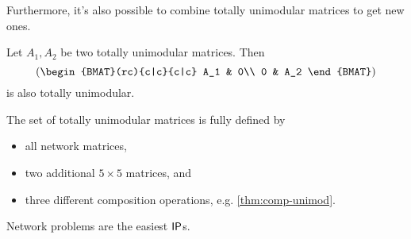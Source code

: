 Furthermore, it's also possible to combine totally unimodular matrices to get new ones.
\begin{theorem}
    Let $A_1,A_2$ be two totally unimodular matrices. Then
    \[
        \left(
        \begin{BMAT}(rc){c|c}{c|c}
                A_1 & 0\\
                0 & A_2
            \end{BMAT}
        \right)
    \]
    is also totally unimodular. \label{thm:comp-unimod}
\end{theorem}
\begin{theorem}[Seymour]
    The set of totally unimodular matrices is fully defined by
    \begin{itemize}
        \item all network matrices,
        \item two additional $5\times 5$ matrices, and
        \item three different composition operations, e.g. \autoref{thm:comp-unimod}.
    \end{itemize}
\end{theorem}
\begin{conclusion}
    Network problems are the easiest $\mathsf{IP}$s.
\end{conclusion}